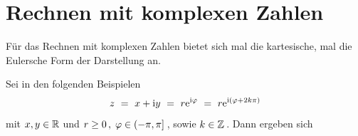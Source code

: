 \section{Rechnen mit komplexen Zahlen}

Für das Rechnen mit komplexen Zahlen bietet sich mal die kartesische, mal die
Eulersche Form der Darstellung an.

\noindent Sei in den folgenden Beispielen
\[
z
\ =\ x+\mathrm{i} y
\ =\ r\mathrm{e}^{\mathrm{i}\varphi}
\ =\ r\mathrm{e}^{\mathrm{i}(\varphi+2k\pi)}
\]
mit \;$\displaystyle{}x,y\in\mathbb{R}$\; und \;$\displaystyle{}r\ge0\,,\;\varphi\in({-\pi},{\pi}]$\,,\; sowie \;$\displaystyle{}k\in\mathbb{Z}$\,. Dann ergeben sich
